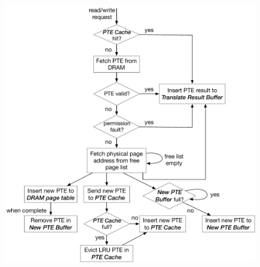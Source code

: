 \documentclass[10pt,times,twocolumn]{article}
\begin{document}
\begin{appendices}
{
\begin{figure}[!ht]
\begin{minipage}{\columnwidth}
\begin{center}
\centerline{\includegraphics[width=\textwidth]{Figures/CoreMemStateDiagram.pdf}}
{
}
\end{center}
\end{minipage}
\end{figure}
}

\end{appendices}



\end{document}
